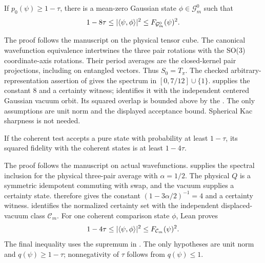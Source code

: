 \begin{theorem}\label{thm:main-boson-mean-zero}
  \par
  \leanok
  If $p_0(\psi)\ge1-\tau$, there is a mean-zero Gaussian state
  $\phi\in\mathcal G_m^0$ such that
  \[
    1-8\tau\le\lvert\langle \psi, \phi\rangle\rvert^2\le F_{\mathcal G_m^0}(\psi)^2.
  \]

  The proof follows the manuscript on the physical tensor cube. The canonical
  wavefunction equivalence intertwines the three pair rotations with the
  SO(3) coordinate-axis rotations. Their period averages are the closed-kernel
  pair projections, including on entangled vectors. Thus $S_0=T_\pi$.
  The checked arbitrary-representation assertion of
   gives the spectrum in $[0,7/12]\cup\{1\}$.
   supplies the constant $8$ and a certainty witness;
   identifies it with the independent centered
  Gaussian vacuum orbit. Its squared overlap is bounded above by the
  . The only assumptions are unit norm
  and the displayed acceptance bound. Spherical Kac sharpness is not needed.
\end{theorem}

\begin{theorem}\label{thm:main-boson-coherent}
  \par
  \leanok
  If the coherent test accepts a pure state with probability at least $1-\tau$,
  its squared fidelity with the coherent states is at least $1-4\tau$.

  The proof follows the manuscript on actual wavefunctions.
   supplies the spectral inclusion for the physical
  three-pair average with $\alpha=1/2$. The physical $Q$ is a symmetric
  idempotent commuting with swap, and the vacuum supplies a certainty state.
   therefore gives the constant
  $(1-3\alpha/2)^{-1}=4$ and a certainty witness.
   identifies the normalized certainty set
  with the independent displaced-vacuum class $\mathcal C_m$.
  For one coherent comparison state $\phi$, Lean proves
  \[
    1-4\tau\le\lvert\langle \psi, \phi\rangle\rvert^2\le F_{\mathcal C_m}(\psi)^2.
  \]
  The final inequality uses the supremum in .
  The only hypotheses are unit norm and $q(\psi)\ge1-\tau$;
  nonnegativity of $\tau$ follows from $q(\psi)\le1$.
\end{theorem}

